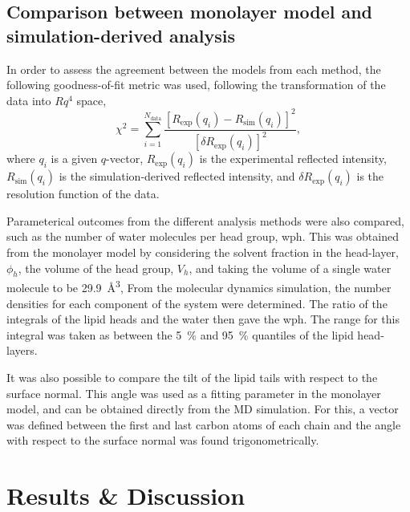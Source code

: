 \documentclass[twoside,twocolumn,9pt]{article}
\begin{document}
\subsection{Comparison between monolayer model and simulation-derived analysis}
\label{sec:para}
In order to assess the agreement between the models from each method, the following goodness-of-fit metric was used, following the transformation of the data into $Rq^4$ space,
%
\begin{equation}
  \chi^2 = \sum_{i=1}^{N_{\text{data}}} \frac{[R_{\text{exp}}(q_i) - R_{\text{sim}}(q_i)]^2}{[\delta R_{\text{exp}}(q_i)]^2},
\end{equation}
%
where $q_i$ is a given $q$-vector, $R_{\text{exp}}(q_i)$ is the experimental reflected intensity, $R_{\text{sim}}(q_i)$ is the simulation-derived reflected intensity, and $\delta R_{\text{exp}}(q_i)$ is the resolution function of the data.

Parameterical outcomes from the different analysis methods were also compared, such as the number of water molecules per head group, wph.
This was obtained from the monolayer model by considering the solvent fraction in the head-layer, $\phi_h$, the volume of the head group, $V_h$, and taking the volume of a single water molecule to be \SI{29.9}{\cubic\angstrom},
%
%
From the molecular dynamics simulation, the number densities for each component of the system were determined.
The ratio of the integrals of the lipid heads and the water then gave the wph.
The range for this integral was taken as between the \SI{5}{\percent} and \SI{95}{\percent} quantiles of the lipid head-layers.

It was also possible to compare the tilt of the lipid tails with respect to the surface normal.
This angle was used as a fitting parameter in the monolayer model, and can be obtained directly from the MD simulation.
For this, a vector was defined between the first and last carbon atoms of each chain and the angle with respect to the surface normal was found trigonometrically.

\section{Results \& Discussion}
\end{document}
